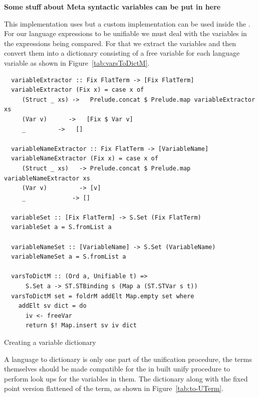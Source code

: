 \documentclass[thesis-solanki.tex]{subfiles}
\begin{document}
\textbf{Some stuff about Meta syntactic variables can be put in here}

This implementation uses 
but a custom implementation can be used inside the .
For our language expressions to be unifiable we must deal with the variables in the expressions being compared.
For that we extract the variables and then convert them into a dictionary consisting of a free variable for each
language variable as shown in Figure~\ref{tab:varsToDictM}.

\begin{code-list}
  \begin{verbatim}
  variableExtractor :: Fix FlatTerm -> [Fix FlatTerm]
  variableExtractor (Fix x) = case x of
     (Struct _ xs) ->   Prelude.concat $ Prelude.map variableExtractor xs
     (Var v)      ->   [Fix $ Var v]
     _         ->   []

  variableNameExtractor :: Fix FlatTerm -> [VariableName]
  variableNameExtractor (Fix x) = case x of
     (Struct _ xs)   -> Prelude.concat $ Prelude.map variableNameExtractor xs
     (Var v)         -> [v]
     _             -> []

  variableSet :: [Fix FlatTerm] -> S.Set (Fix FlatTerm)
  variableSet a = S.fromList a

  variableNameSet :: [VariableName] -> S.Set (VariableName)
  variableNameSet a = S.fromList a

  varsToDictM :: (Ord a, Unifiable t) =>
      S.Set a -> ST.STBinding s (Map a (ST.STVar s t))
  varsToDictM set = foldrM addElt Map.empty set where
    addElt sv dict = do
      iv <- freeVar
      return $! Map.insert sv iv dict
  \end{verbatim}
  \vspace*{-1.0\baselineskip}
  \caption{Creating a variable dictionary}
  \label{tab:varsToDictM}
\end{code-list}
A language to  dictionary is only one part of the unification procedure, the terms themselves should be made
compatible for the in built unify procedure to perform look ups for the variables in them.
The dictionary along with the fixed point version flattened of the term, as shown in Figure~\ref{tab:to-UTerm}.
%
\end{document}
